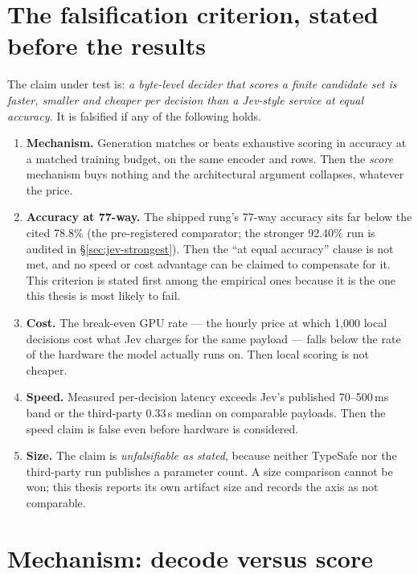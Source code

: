 \section{The falsification criterion, stated before the results}

The claim under test is: \emph{a byte-level decider that scores a finite
candidate set is faster, smaller and cheaper per decision than a Jev-style
service at equal accuracy.} It is falsified if any of the following holds.

\begin{enumerate}
  \item \textbf{Mechanism.} Generation matches or beats exhaustive scoring in
        accuracy at a matched training budget, on the same encoder and rows.
        Then the \emph{score} mechanism buys nothing and the architectural
        argument collapses, whatever the price.
  \item \textbf{Accuracy at 77-way.} The shipped rung's 77-way accuracy sits far
        below the cited 78.8\% (the pre-registered comparator; the stronger
        92.40\% run is audited in \S\ref{sec:jev-strongest}). Then the ``at equal accuracy'' clause is not
        met, and no speed or cost advantage can be claimed to compensate for
        it. This criterion is stated first among the empirical ones because it
        is the one this thesis is most likely to fail.
  \item \textbf{Cost.} The break-even GPU rate --- the hourly price at which
        1,000 local decisions cost what Jev charges for the same payload ---
        falls below the rate of the hardware the model actually runs on. Then
        local scoring is not cheaper.
  \item \textbf{Speed.} Measured per-decision latency exceeds Jev's published
        70--500\,ms band or the third-party 0.33\,s median on comparable
        payloads. Then the speed claim is false even before hardware is
        considered.
  \item \textbf{Size.} The claim is \emph{unfalsifiable as stated}, because
        neither TypeSafe nor the third-party run publishes a parameter count.
        A size comparison cannot be won; this thesis reports its own artifact
        size and records the axis as not comparable.
\end{enumerate}

\section{Mechanism: decode versus score}

